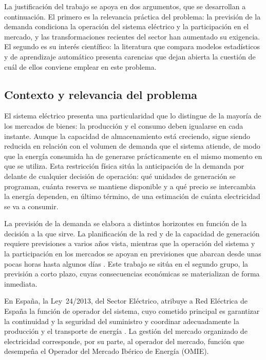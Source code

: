 La justificación del trabajo se apoya en dos argumentos, que se desarrollan a
continuación. El primero es la relevancia práctica del problema: la previsión
de la demanda condiciona la operación del sistema eléctrico y la participación
en el mercado, y las transformaciones recientes del sector han aumentado su
exigencia. El segundo es su interés científico: la literatura que compara
modelos estadísticos y de aprendizaje automático presenta carencias que dejan
abierta la cuestión de cuál de ellos conviene emplear en este problema.

\subsection{Contexto y relevancia del problema}\label{sec:contexto}

El sistema eléctrico presenta una particularidad que lo distingue de la mayoría
de los mercados de bienes: la producción y el consumo deben igualarse en cada
instante. Aunque la capacidad de almacenamiento está creciendo, sigue siendo
reducida en relación con el volumen de demanda que el sistema atiende, de modo
que la energía consumida ha de generarse prácticamente en el mismo momento en
que se utiliza. Esta restricción física sitúa la anticipación de la demanda por
delante de cualquier decisión de operación: qué unidades de generación se
programan, cuánta reserva se mantiene disponible y a qué precio se intercambia
la energía dependen, en último término, de una estimación de cuánta
electricidad se va a consumir.

La previsión de la demanda se elabora a distintos horizontes en función de la
decisión a la que sirve. La planificación de la red y de la capacidad de
generación requiere previsiones a varios años vista, mientras que la operación
del sistema y la participación en los mercados se apoyan en previsiones que
abarcan desde unas pocas horas hasta algunos días \parencite{hong2016probabilistic}.
Este trabajo se sitúa en el segundo grupo, la previsión a corto plazo, cuyas
consecuencias económicas se materializan de forma inmediata.

En España, la Ley~24/2013, del Sector Eléctrico, atribuye a Red Eléctrica de
España la función de operador del sistema, cuyo cometido principal es
garantizar la continuidad y la seguridad del suministro y coordinar
adecuadamente la producción y el transporte de energía \parencite{ley2013sectorelectrico}.
La gestión del mercado organizado de electricidad corresponde, por su parte, al
operador del mercado, función que desempeña el Operador del Mercado Ibérico de
Energía (OMIE).

